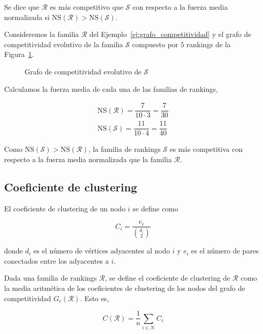 \begin{defi}
Se dice que $\mathcal{R}$ es más competitivo que $\mathcal{S}$ con respecto a la fuerza media normalizada si $\mathrm{NS}(\mathcal{R}) > \mathrm{NS}(\mathcal{S})$.
\end{defi}

\begin{ejemplo}
Consideremos la familia $\mathcal{R}$ del Ejemplo~\ref{ej:grafo_competitividad} y el grafo de competitividad evolutivo de la familia $\mathcal{S}$ compuesto por $5$ rankings de la Figura~\ref{fig:fuerza_media}.\\


\begin{figure}[htb]
\centering
\ejemplofuerzamedia
\caption{Grafo de competitividad evolutivo de $\mathcal{S}$}
\label{fig:fuerza_media}
\end{figure}

Calculamos la fuerza media de cada una de las familias de rankings,

\begin{eqnarray*}
\mathrm{NS}(\mathcal{R}) = \dfrac{7}{10 \cdot 3} = \dfrac{7}{30}\\
\mathrm{NS}(\mathcal{S}) = \dfrac{11}{10\cdot 4} = \dfrac{11}{40}
\end{eqnarray*}

Como $\mathrm{NS}(\mathcal{S}) > \mathrm{NS}(\mathcal{R})$, la familia de rankings $\mathcal{S}$ es más competitiva con respecto a la fuerza media normalizada que la familia $\mathcal{R}$.

\end{ejemplo}

\subsection*{Coeficiente de clustering}

\begin{defi}
El coeficiente de clustering de un nodo $i$ se define como

\begin{equation}
C_i = \dfrac{e_i}{\binom{d_i}{2}}
\end{equation}

donde $d_i$ es el número de vértices adyacentes al nodo $i$ y $e_i$ es el número de pares conectados entre los adyacentes a $i$.
\end{defi}

\begin{defi}
Dada una familia de rankings $\mathcal{R}$, se define el coeficiente de clustering de $\mathcal{R}$ como la media aritmética de los coeficientes de clustering de los nodos del grafo de competitividad $G_c(\mathcal{R})$. Esto es,

\begin{equation}
C(\mathcal{R}) = \dfrac{1}{n} \sum_{i \in \mathcal{N}} C_i
\end{equation}
\end{defi}

